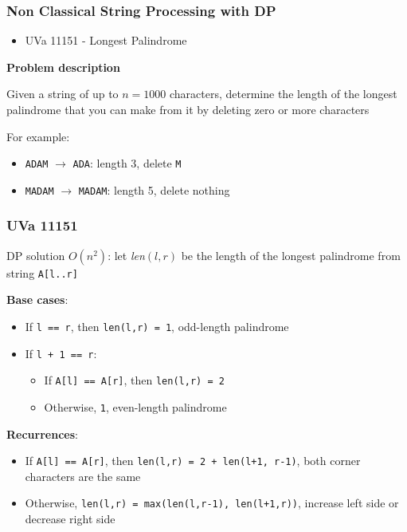 \documentclass{beamer}
\begin{document}
\begin{frame}[fragile]
\frametitle{Non Classical String Processing with DP}

\begin{itemize}
    \item \color{blue}UVa 11151 - Longest Palindrome\color{black}
\end{itemize}

\vspace{0.3cm}

\color{red}\textbf{Problem description}\color{black}

Given a string of up to $n = 1000$ characters, determine the length of the longest palindrome that you can make from it by deleting zero or more characters

\pause 
\vspace{0.3cm}

For example:

\begin{itemize}
    \item \verb|ADAM| $\rightarrow$ \verb|ADA|: length 3, delete \verb|M|
    \item \verb|MADAM| $\rightarrow$ \verb|MADAM|: length 5, delete nothing
\end{itemize}

\end{frame}

\begin{frame}[fragile]
\frametitle{UVa 11151}

DP solution $O(n^2)$: let \textit{len}$(l,r)$ be the length of the longest palindrome from string \verb|A[l..r]|

\vspace{0.3cm}

\pause
\textbf{Base cases}:

\begin{itemize}
    \item If \verb|l == r|, then \verb|len(l,r) = 1|, odd-length palindrome
    \item If \verb|l + 1 == r|:
    	\begin{itemize}
		    \item If \verb|A[l] == A[r]|, then \verb|len(l,r) = 2|
		    \item Otherwise, \verb|1|, even-length palindrome
		\end{itemize}
\end{itemize}

\pause 

\textbf{Recurrences}:
\begin{itemize}
    \item If \verb|A[l] == A[r]|, then \verb|len(l,r) = 2 + len(l+1, r-1)|, both corner characters are the same
    \item Otherwise, \verb|len(l,r) = max(len(l,r-1), len(l+1,r))|, increase left side or decrease right side
\end{itemize}

\end{frame}
\end{document}
